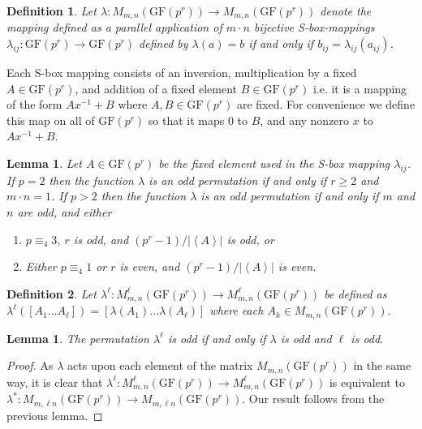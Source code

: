 \documentclass[11pt]{amsart}
\newcommand{\GF}{\mathrm{GF}}
\newtheorem{definition}{{\bf Definition}}
\newtheorem{lemma}[theorem]{{\bf Lemma }}
\begin{document}
\begin{definition} 
Let $\lambda: M_{m,n}(\GF(p^r))\rightarrow M_{m,n}(\GF(p^r))$ denote the mapping defined as a parallel application of $m \cdot n$ bijective S-box-mappings $\lambda_{ij} : \GF(p^r) \rightarrow \GF(p^r)$ defined by $\lambda(a) = b$ if and only if $b_{ij}=\lambda_{ij}(a_{ij})$.
\end{definition}
Each S-box mapping consists of an inversion, multiplication by a fixed  $A\in \GF(p^r)$, and addition of a fixed element $B\in\GF(p^r)$ i.e. it is a mapping of the form $Ax^{-1}+B$ where $A,B\in \GF(p^r)$ are fixed. For convenience we define this map on all of $\GF(p^r)$ so that it maps $0$ to $B$, and any nonzero $x$ to $Ax^{-1}+B$.
\begin{lemma}\label{SBlemma}
Let $A\in \GF(p^r)$ be the fixed element used in the S-box mapping $\lambda_{ij}$.  If $p=2$ then the function $\lambda$ is an odd permutation if and only if $r\geq 2$ and $m\cdot n=1$. If  $p>2$ then the function $\lambda$ is an odd permutation if and only if $m$ and $n$ are odd, and either
\begin{enumerate}
\item $p \equiv_{4} 3$, $r$ is odd, and $(p^r-1)/\left\vert\left\langle A \right\rangle\right\vert$ is odd, or 
\item Either $p \equiv_{4} 1$ or $r$ is even, and $(p^r-1)/\left\vert\left\langle A \right\rangle\right\vert$ is even.
\end{enumerate}
\end{lemma}

\begin{definition}
Let $\lambda^\ell : M^{\ell}_{m,n}(\GF(p^r)) \to M^{\ell}_{m,n}(\GF(p^r))$ be defined as \\
$\lambda^\ell([A_1 \dots A_\ell]) = [\lambda(A_1) \dots \lambda(A_\ell)]$ where each $A_k \in M_{m,n}(\GF(p^r))$.
\end{definition}

\begin{lemma}
The permutation $\lambda^\ell$ is odd if and only if $\lambda$ is odd and $\ell$ is odd.
\end{lemma}
\begin{proof}
As $\lambda$ acts upon each element of the matrix $M_{m,n}(\GF(p^r))$ in the same way, it is clear that $\lambda^\ell : M^{\ell}_{m,n}(\GF(p^r)) \to M^{\ell}_{m,n}(\GF(p^r))$ is equivalent to $\lambda^* : M_{m,\ell n}(\GF(p^r)) \to M_{m,\ell n}(\GF(p^r))$. Our result follows from the previous lemma.
\end{proof}
\end{document}
